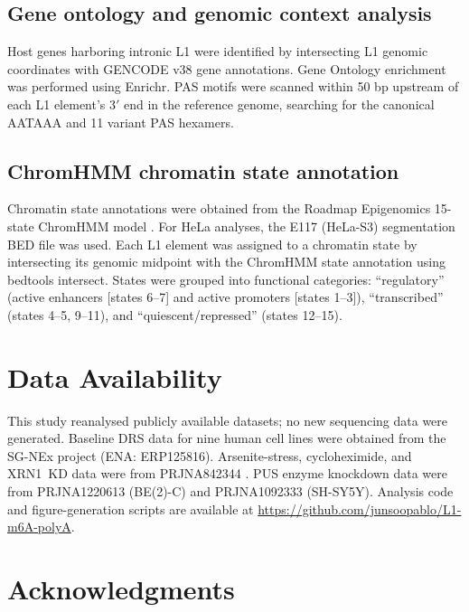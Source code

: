\documentclass[11pt]{article}
\begin{document}
\subsection*{Gene ontology and genomic context analysis}

Host genes harboring intronic L1 were identified by intersecting L1
genomic coordinates with GENCODE v38 gene annotations. Gene Ontology
enrichment was performed using Enrichr. PAS motifs were scanned within
50 bp upstream of each L1 element's $3'$ end in the reference genome,
searching for the canonical AATAAA and 11 variant PAS hexamers.

\subsection*{ChromHMM chromatin state annotation}

Chromatin state annotations were obtained from the Roadmap
Epigenomics 15-state ChromHMM model \citep{Roadmap2015}. For HeLa
analyses, the E117 (HeLa-S3) segmentation BED file was used. Each L1
element was assigned to a chromatin state by intersecting its genomic
midpoint with the ChromHMM state annotation using bedtools intersect.
States were grouped into functional categories: ``regulatory'' (active
enhancers [states 6--7] and active promoters [states 1--3]),
``transcribed'' (states 4--5, 9--11), and ``quiescent/repressed''
(states 12--15).

\section{Data Availability}

This study reanalysed publicly available datasets; no new sequencing
data were generated. Baseline DRS data for nine human cell lines were
obtained from the SG-NEx project (ENA: ERP125816). Arsenite-stress,
cycloheximide, and XRN1~KD data were from PRJNA842344
\citep{deMuro2024}. PUS enzyme knockdown data were from PRJNA1220613
(BE(2)-C) and PRJNA1092333 (SH-SY5Y). Analysis code and
figure-generation scripts are available at \url{https://github.com/junsoopablo/L1-m6A-polyA}.

\section*{Acknowledgments}
\end{document}
